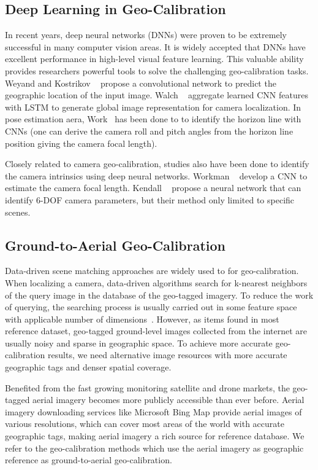 \subsection{Deep Learning in Geo-Calibration}
In recent years, deep neural networks (DNNs) were proven to be
extremely successful in many computer vision areas. 
It is widely accepted that DNNs have excellent performance in
high-level visual feature learning.
This valuable ability provides researchers powerful tools to
solve the challenging geo-calibration tasks.
Weyand and Kostrikov \etal~\cite{planet} propose a convolutional
network to predict the geographic location of the input
image. Walch \etal~\cite{walch2017image} aggregate learned CNN
features with LSTM to generate global image representation for camera
localization.  In pose estimation aera, Work~\cite{zhai2016horizon,
workman2016horizon, hold2017perceptual} has been done to to identify
the horizon line with CNNs (one can derive the camera roll and pitch
angles from the horizon line position giving the camera focal length).

Closely related to camera geo-calibration, studies also have been done
to identify the camera intrinsics using deep neural networks.
Workman \etal~\cite{workman2015deepfocal} develop a CNN to estimate the camera
focal length. Kendall \etal~\cite{kendall2015convolutional} propose a
neural network that can identify 6-DOF camera parameters, but their
method only limited to specific scenes.


\subsection{Ground-to-Aerial Geo-Calibration}
Data-driven scene matching approaches are widely used to for
geo-calibration.
When localizing a camera, data-driven algorithms search for k-nearest
neighbors of the query image in the database of the geo-tagged imagery.
To reduce the work of querying, the searching process is usually
carried out in some feature space with applicable number of  
dimensions~\cite{im2gps, li2010location,zamir2010accurate}.
However, as items found in most reference dataset, geo-tagged
ground-level images collected from the internet are usually noisy and
sparse in geographic space. To achieve more accurate geo-calibration
results, we need alternative image resources with more accurate
geographic tags and denser spatial coverage.

Benefited from the fast growing monitoring satellite and drone markets,
the geo-tagged aerial imagery becomes more publicly accessible
than ever before. Aerial imagery downloading services like
Microsoft Bing Map provide aerial images of various
resolutions, which can cover most areas of the world with accurate
geographic tags, making aerial imagery a rich source for
reference database. We refer to the geo-calibration methods
which use the aerial imagery as geographic reference as
ground-to-aerial geo-calibration.

